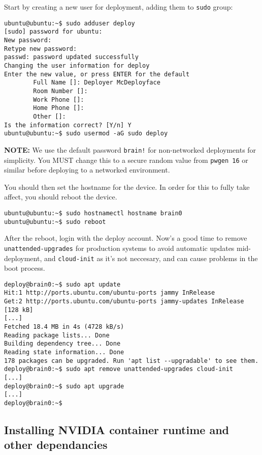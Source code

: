 \documentclass[11pt]{article}
\begin{document}
Start by creating a new user for deployment, adding them to \texttt{sudo} group:

\lstset{style=console}
\begin{lstlisting}
ubuntu@ubuntu:~$ sudo adduser deploy
[sudo] password for ubuntu:
New password:
Retype new password:
passwd: password updated successfully
Changing the user information for deploy
Enter the new value, or press ENTER for the default
        Full Name []: Deployer McDeployface
        Room Number []:
        Work Phone []:
        Home Phone []:
        Other []:
Is the information correct? [Y/n] Y
ubuntu@ubuntu:~$ sudo usermod -aG sudo deploy
\end{lstlisting}

\textbf{NOTE:} We use the default password \texttt{brain!} for non-networked deployments for simplicity. You MUST change this to a secure random value from \texttt{pwgen 16} or similar before deploying to a networked environment.

You should then set the hostname for the device. In order for this to fully take affect, you should reboot the device.

\begin{lstlisting}
ubuntu@ubuntu:~$ sudo hostnamectl hostname brain0
ubuntu@ubuntu:~$ sudo reboot
\end{lstlisting}

After the reboot, login with the deploy account. Now's a good time to remove \texttt{unattended-upgrades} for production systems to avoid automatic updates mid-deployment, and \texttt{cloud-init} as it's not neccesary, and can cause problems in the boot process.

\lstset{style=console}
\begin{lstlisting}
deploy@brain0:~$ sudo apt update
Hit:1 http://ports.ubuntu.com/ubuntu-ports jammy InRelease
Get:2 http://ports.ubuntu.com/ubuntu-ports jammy-updates InRelease [128 kB]
[...]
Fetched 18.4 MB in 4s (4728 kB/s)
Reading package lists... Done
Building dependency tree... Done
Reading state information... Done
178 packages can be upgraded. Run 'apt list --upgradable' to see them.
deploy@brain0:~$ sudo apt remove unattended-upgrades cloud-init
[...]
deploy@brain0:~$ sudo apt upgrade
[...]
deploy@brain0:~$
\end{lstlisting}

\subsection{Installing NVIDIA container runtime and other dependancies}
\end{document}
